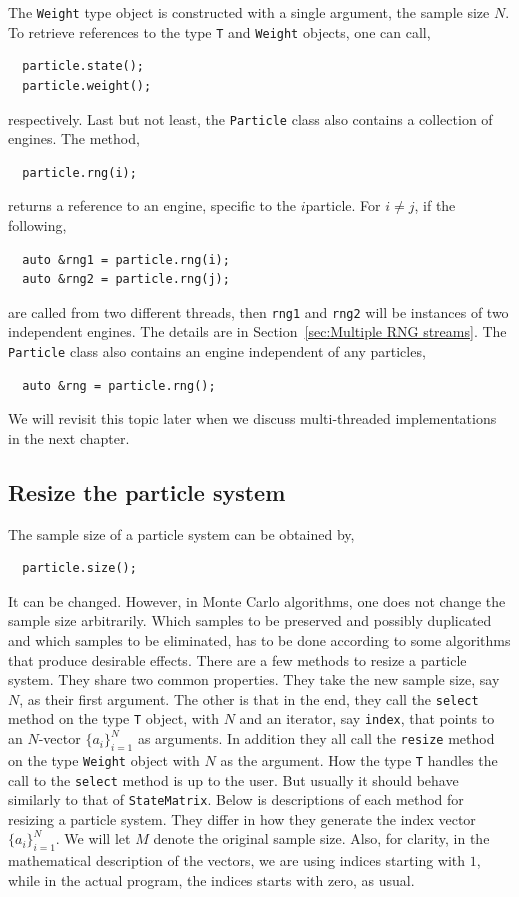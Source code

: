 The \verb|Weight| type object is constructed with a single argument, the sample
size $N$. To retrieve references to the type \verb|T| and \verb|Weight|
objects, one can call,
\begin{Verbatim}
  particle.state();
  particle.weight();
\end{Verbatim}
respectively. Last but not least, the \verb|Particle| class also contains a
collection of \rng engines. The method,
\begin{Verbatim}
  particle.rng(i);
\end{Verbatim}
returns a reference to an \rng engine, specific to the $i$\ith particle. For $i
\ne j$, if the following,
\begin{Verbatim}
  auto &rng1 = particle.rng(i);
  auto &rng2 = particle.rng(j);
\end{Verbatim}
are called from two different threads, then \verb|rng1| and \verb|rng2| will be
instances of two independent \rng engines. The details are in
Section~\ref{sec:Multiple RNG streams}. The \verb|Particle| class also contains
an \rng engine independent of any particles,
\begin{Verbatim}
  auto &rng = particle.rng();
\end{Verbatim}
We will revisit this topic later when we discuss multi-threaded implementations
in the next chapter.

\subsection{Resize the particle system}
\label{sub:Resize the particle system}

The sample size of a particle system can be obtained by,
\begin{Verbatim}
  particle.size();
\end{Verbatim}
It can be changed. However, in Monte Carlo algorithms, one does not change the
sample size arbitrarily. Which samples to be preserved and possibly duplicated
and which samples to be eliminated, has to be done according to some algorithms
that produce desirable effects. There are a few methods to resize a particle
system. They share two common properties. They take the new sample size, say
$N$, as their first argument. The other is that in the end, they call the
\verb|select| method on the type \verb|T| object, with $N$ and an iterator, say
\verb|index|, that points to an $N$-vector $\{a_i\}_{i=1}^N$ as arguments. In
addition they all call the \verb|resize| method on the type \verb|Weight|
object with $N$ as the argument. How the type \verb|T| handles the call to the
\verb|select| method is up to the user. But usually it should behave similarly
to that of \verb|StateMatrix|. Below is descriptions of each method for
resizing a particle system. They differ in how they generate the index vector
$\{a_i\}_{i=1}^N$. We will let $M$ denote the original sample size. Also, for
clarity, in the mathematical description of the vectors, we are using indices
starting with $1$, while in the actual \cpp program, the indices starts with
zero, as usual.


